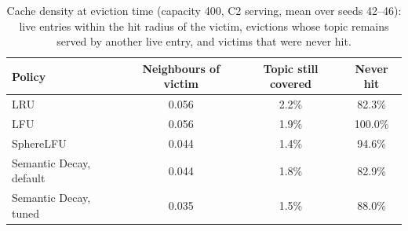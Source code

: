 \begin{table}[htbp]
\centering
\caption{Cache density at eviction time (capacity 400, C2 serving, mean over seeds 42--46): live entries within the hit radius of the victim, evictions whose topic remains served by another live entry, and victims that were never hit.}
\label{tab:eviction_density}
\footnotesize
\begin{tabular}{lccc}
\toprule
Policy & Neighbours of victim & Topic still covered & Never hit \\
\midrule
LRU & 0.056 & 2.2\% & 82.3\% \\
LFU & 0.056 & 1.9\% & 100.0\% \\
SphereLFU & 0.044 & 1.4\% & 94.6\% \\
Semantic Decay, default & 0.044 & 1.8\% & 82.9\% \\
Semantic Decay, tuned & 0.035 & 1.5\% & 88.0\% \\
\bottomrule
\end{tabular}
\end{table}

